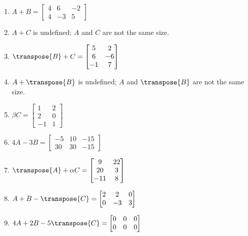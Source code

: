 \begin{enumerate}
\item $A + B = \begin{bmatrix} 4 &  6 & -2 \\ 4 & -3 & 5 \end{bmatrix}$
\item $A + C$ is undefined; $A$ and $C$ are not the same size.
\item $\transpose{B} + C = \begin{bmatrix} 5 & 2 \\ 6 & -6 \\ -1 & 7 \end{bmatrix}$
\item $A + \transpose{B}$  is undefined; $A$ and $\transpose{B}$ are not the same size.
\item $\beta C = \begin{bmatrix} 1 & 2 \\ 2 & 0 \\ -1 & 1 \end{bmatrix}$
\item $4A - 3B = \begin{bmatrix} -5 & 10 & -15\\ 30 & 30 & -15 \end{bmatrix}$
\item $\transpose{A} + \alpha C = \begin{bmatrix} 9 & 22 \\ 20 & 3\\ -11 & 8 \end{bmatrix}$
\item $A + B - \transpose{C} = \begin{bmatrix} 2 & 2 & 0\\ 0 & -3 & 3\end{bmatrix}$
\item $4A + 2B - 5\transpose{C} = \begin{bmatrix} 0 & 0 & 0 \\ 0 & 0 & 0 \end{bmatrix}$
\end{enumerate}